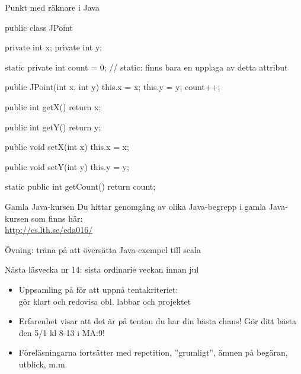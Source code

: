 \begin{Slide}{Punkt med räknare i Java}

\begin{Code}[language=Java,basicstyle=\ttfamily\SlideFontSize{5.2}{6}]
public class JPoint {
    private int x;
    private int y;

    static private int count = 0;  // static: finns bara en upplaga av detta attribut

    public JPoint(int x, int y){
        this.x = x;
        this.y = y;
        count++;
    }

    public int getX(){
        return x;
    }

    public int getY(){
        return y;
    }

    public void setX(int x){
        this.x = x;
    }

    public void setY(int y){
        this.y = y;
    }

    static public int getCount(){
       return count;
    }
}
\end{Code}


\end{Slide}

\begin{Slide}{Gamla Java-kursen}
Du hittar genomgång av olika Java-begrepp i gamla Java-kursen som finns här: \\\vspace{1em}
\url{http://cs.lth.se/eda016/}
\\\vspace{2em}

Övning: träna på att översätta Java-exempel till scala

\end{Slide}

\begin{Slide}{Nästa läsvecka nr 14: sista ordinarie veckan innan jul}

  \begin{itemize}
    \item Uppsamling på  för att uppnå tentakriteriet: \\ gör klart och redovisa  obl. labbar och projektet

    \item Erfarenhet visar att det är på   tentan du har din bästa chans! Gör ditt bästa den 5/1 kl 8-13 i MA:9!

    \item Föreläsningarna fortsätter med repetition, ''grumligt'', ämnen på begäran, utblick, m.m.

  \end{itemize}

\end{Slide}


\fi
